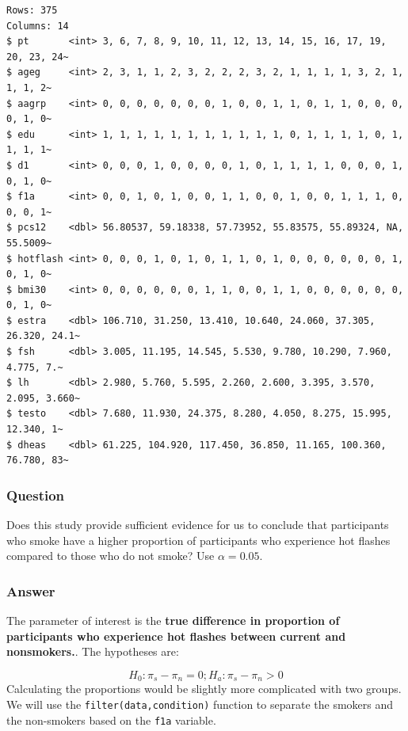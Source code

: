 \documentclass[
  letterpaper,
  DIV=11,
  numbers=noendperiod]{scrartcl}
\newenvironment{Shaded}{\begin{snugshade}}{\end{snugshade}}
\newcommand{\DecValTok}[1]{\textcolor[rgb]{0.68,0.00,0.00}{#1}}
\newcommand{\FunctionTok}[1]{\textcolor[rgb]{0.28,0.35,0.67}{#1}}
\newcommand{\NormalTok}[1]{\textcolor[rgb]{0.00,0.23,0.31}{#1}}
\newcommand{\OtherTok}[1]{\textcolor[rgb]{0.00,0.23,0.31}{#1}}
\newcommand{\SpecialCharTok}[1]{\textcolor[rgb]{0.37,0.37,0.37}{#1}}
\begin{document}
\begin{verbatim}
Rows: 375
Columns: 14
$ pt       <int> 3, 6, 7, 8, 9, 10, 11, 12, 13, 14, 15, 16, 17, 19, 20, 23, 24~
$ ageg     <int> 2, 3, 1, 1, 2, 3, 2, 2, 2, 3, 2, 1, 1, 1, 1, 3, 2, 1, 1, 1, 2~
$ aagrp    <int> 0, 0, 0, 0, 0, 0, 0, 1, 0, 0, 1, 1, 0, 1, 1, 0, 0, 0, 0, 1, 0~
$ edu      <int> 1, 1, 1, 1, 1, 1, 1, 1, 1, 1, 1, 0, 1, 1, 1, 1, 0, 1, 1, 1, 1~
$ d1       <int> 0, 0, 0, 1, 0, 0, 0, 0, 1, 0, 1, 1, 1, 1, 0, 0, 0, 1, 0, 1, 0~
$ f1a      <int> 0, 0, 1, 0, 1, 0, 0, 1, 1, 0, 0, 1, 0, 0, 1, 1, 1, 0, 0, 0, 1~
$ pcs12    <dbl> 56.80537, 59.18338, 57.73952, 55.83575, 55.89324, NA, 55.5009~
$ hotflash <int> 0, 0, 0, 1, 0, 1, 0, 1, 1, 0, 1, 0, 0, 0, 0, 0, 0, 1, 0, 1, 0~
$ bmi30    <int> 0, 0, 0, 0, 0, 0, 1, 1, 0, 0, 1, 1, 0, 0, 0, 0, 0, 0, 0, 1, 0~
$ estra    <dbl> 106.710, 31.250, 13.410, 10.640, 24.060, 37.305, 26.320, 24.1~
$ fsh      <dbl> 3.005, 11.195, 14.545, 5.530, 9.780, 10.290, 7.960, 4.775, 7.~
$ lh       <dbl> 2.980, 5.760, 5.595, 2.260, 2.600, 3.395, 3.570, 2.095, 3.660~
$ testo    <dbl> 7.680, 11.930, 24.375, 8.280, 4.050, 8.275, 15.995, 12.340, 1~
$ dheas    <dbl> 61.225, 104.920, 117.450, 36.850, 11.165, 100.360, 76.780, 83~
\end{verbatim}

\subsubsection{Question}

Does this study provide sufficient evidence for us to conclude that
participants who smoke have a higher proportion of participants who
experience hot flashes compared to those who do not smoke? Use
\(\alpha=0.05\).

\subsubsection{Answer}

The parameter of interest is the \textbf{true difference in proportion
of participants who experience hot flashes between current and
nonsmokers.}. The hypotheses are:

\[
H_0: \pi_s-\pi_n = 0; H_a: \pi_s-\pi_n > 0
\] Calculating the proportions would be slightly more complicated with
two groups. We will use the \texttt{filter(data,condition)} function to
separate the smokers and the non-smokers based on the \texttt{f1a}
variable.

\begin{Shaded}
\end{Shaded}
\end{document}
